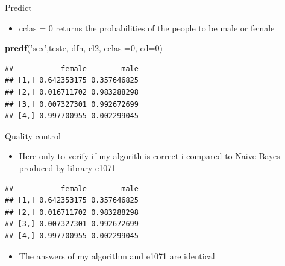 \documentclass[
  10pt,
  ignorenonframetext,
]{beamer}
\newenvironment{Shaded}{\begin{snugshade}}{\end{snugshade}}
\newcommand{\DataTypeTok}[1]{\textcolor[rgb]{0.13,0.29,0.53}{#1}}
\newcommand{\DecValTok}[1]{\textcolor[rgb]{0.00,0.00,0.81}{#1}}
\newcommand{\KeywordTok}[1]{\textcolor[rgb]{0.13,0.29,0.53}{\textbf{#1}}}
\newcommand{\NormalTok}[1]{#1}
\newcommand{\OperatorTok}[1]{\textcolor[rgb]{0.81,0.36,0.00}{\textbf{#1}}}
\newcommand{\StringTok}[1]{\textcolor[rgb]{0.31,0.60,0.02}{#1}}
\providecommand{\tightlist}{%
  \setlength{\itemsep}{0pt}\setlength{\parskip}{0pt}}
\begin{document}
\begin{frame}[fragile]{Predict}
\protect\hypertarget{predict-5}{}

\begin{itemize}
\tightlist
\item
  cclas = 0 returns the probabilities of the people to be male or female
\end{itemize}

\begin{Shaded}
\begin{Highlighting}[]
\KeywordTok{predf}\NormalTok{(}\StringTok{'sex'}\NormalTok{,teste, dfn, cl2, }\DataTypeTok{cclas =}\DecValTok{0}\NormalTok{, }\DataTypeTok{cd=}\DecValTok{0}\NormalTok{)}
\end{Highlighting}
\end{Shaded}

\begin{verbatim}
##           female        male
## [1,] 0.642353175 0.357646825
## [2,] 0.016711702 0.983288298
## [3,] 0.007327301 0.992672699
## [4,] 0.997700955 0.002299045
\end{verbatim}

\end{frame}

\begin{frame}[fragile]{Quality control}
\protect\hypertarget{quality-control-1}{}

\begin{itemize}
\tightlist
\item
  Here only to verify if my algorith is correct i compared to Naive
  Bayes produced by library e1071
\end{itemize}

\begin{Shaded}
\end{Shaded}

\begin{verbatim}
##           female        male
## [1,] 0.642353175 0.357646825
## [2,] 0.016711702 0.983288298
## [3,] 0.007327301 0.992672699
## [4,] 0.997700955 0.002299045
\end{verbatim}

\begin{itemize}
\tightlist
\item
  The answers of my algorithm and e1071 are identical
\end{itemize}

\end{frame}
\end{document}
